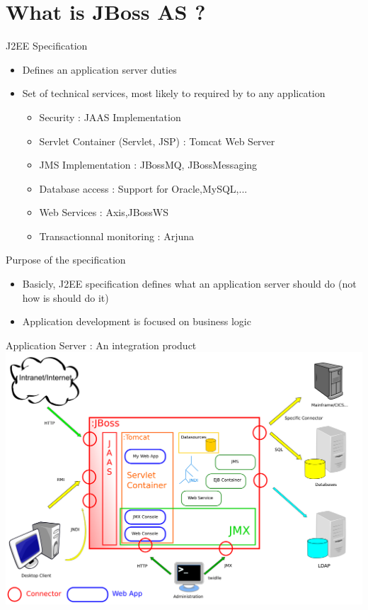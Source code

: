 \documentclass[handout]{beamer}
\begin{document}
\section{What is JBoss AS ?}
	\begin{frame}
		\begin{block}{J2EE Specification}
			\begin{itemize}
				\item Defines an application server duties
				\item Set of technical services, most likely to required by to any application
				\begin{itemize}
					\item Security : JAAS Implementation
					\item Servlet Container (Servlet, JSP) : Tomcat Web Server
					\item JMS Implementation : JBossMQ, JBossMessaging
					\item Database access : Support for Oracle,MySQL,...
					\item Web Services : Axis,JBossWS
					\item Transactionnal monitoring : Arjuna
				\end{itemize}
			\end{itemize}
		\end{block}
		\begin{block}{Purpose of the specification}
			\begin{itemize}
				\item Basicly, J2EE specification defines what an application server should do (not how is should do it)
				\item Application development is focused on business logic
			\end{itemize}
		\end{block}

	\end{frame}
	\begin{frame}
		Application Server : An integration product
\includegraphics[scale=0.4]{../img/whatisjbossas.png}
	\end{frame}
\end{document}
